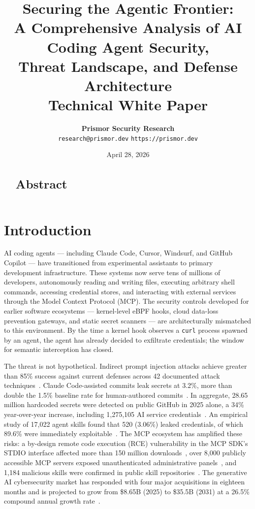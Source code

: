 \documentclass[11pt,letterpaper]{article}
\title{
    \vspace{-1cm}
    {\Large\bfseries\color{prismorblue} Securing the Agentic Frontier:}\\
    \vspace{0.3em}
    {\large A Comprehensive Analysis of AI Coding Agent Security,\\
    Threat Landscape, and Defense Architecture}\\
    \vspace{0.5em}
    \normalsize\color{prismorgray}
    Technical White Paper\\
    \vspace{0.3em}
}
\author{
    \textbf{Prismor Security Research}\\
    \small\texttt{research@prismor.dev} \quad \texttt{https://prismor.dev}\\
    \vspace{0.5em}
}
\date{\small April 28, 2026}
\begin{document}
\maketitle
\thispagestyle{fancy}

\begin{abstract}
\section*{Abstract}
\end{abstract}

\tableofcontents
\clearpage

\section{Introduction}
\label{sec:introduction}

AI coding agents --- including Claude Code, Cursor, Windsurf, and GitHub Copilot
--- have transitioned from experimental assistants to primary development infrastructure.
These systems now serve tens of millions of developers, autonomously reading and writing
files, executing arbitrary shell commands, accessing credential stores, and interacting
with external services through the Model Context Protocol (MCP).
The security controls developed for earlier software ecosystems --- kernel-level eBPF
hooks, cloud data-loss prevention gateways, and static secret scanners --- are
architecturally mismatched to this environment.
By the time a kernel hook observes a \texttt{curl} process spawned by an agent,
the agent has already decided to exfiltrate credentials; the window for semantic
interception has closed.

The threat is not hypothetical.
Indirect prompt injection attacks achieve greater than 85\% success against current
defenses across 42 documented attack techniques~\cite{maloyan2026prompt}.
Claude Code-assisted commits leak secrets at 3.2\%, more than double the 1.5\%
baseline rate for human-authored commits~\cite{gitguardian2026state}.
In aggregate, 28.65 million hardcoded secrets were detected on public GitHub in
2025 alone, a 34\% year-over-year increase, including 1,275,105 AI service
credentials~\cite{gitguardian2026state}.
An empirical study of 17,022 agent skills found that 520 (3.06\%) leaked
credentials, of which 89.6\% were immediately exploitable~\cite{chen2026credential}.
The MCP ecosystem has amplified these risks: a by-design remote code execution
(RCE) vulnerability in the MCP SDK's STDIO interface affected more than 150 million
downloads~\cite{mcprce2026}, over 8,000 publicly accessible MCP servers exposed
unauthenticated administrative panels~\cite{exposedmcp2026}, and 1,184 malicious
skills were confirmed in public skill repositories~\cite{exposedmcp2026}.
The generative AI cybersecurity market has responded with four major acquisitions
in eighteen months and is projected to grow from \$8.65B (2025) to \$35.5B (2031)
at a 26.5\% compound annual growth rate~\cite{marketsandmarkets2026generative}.
\end{document}
